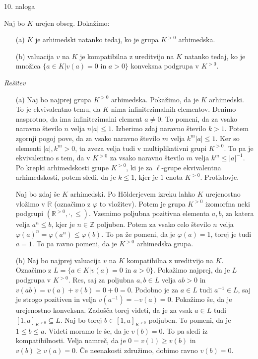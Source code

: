 \documentclass[a4paper, 12pt]{article}
\newcommand{\Z}{\mathbb{Z}}
\newcommand{\R}{\mathbb{R}}
\begin{document}
\begin{flushleft}
10. naloga
\end{flushleft}
Naj bo $K$ urejen obseg. Dokažimo:
\begin{enumerate}
\item[(a)] $K$ je arhimedski natanko tedaj, ko je grupa $K^{>0}$ arhimedska.
\item[(b)] valuacija $v$ na $K$ je kompatibilna z ureditvijo na $K$ natanko tedaj, ko je množica $\{a\in K| v(a) = 0 \text{ in } a > 0\}$ konveksna podgrupa v $K^{>0}$.
\end{enumerate}
\emph{Rešitev}
\begin{enumerate}
\item[(a)] Naj bo najprej grupa $K^{>0}$ arhimedska. Pokažimo, da je $K$ arhimedski. To je ekvivalentno temu, da $K$ nima infinitezimalnih elementov. Denimo nasprotno, da ima infinitezimalni element $a \neq 0$. To pomeni, da za vsako naravno število $n$ velja $n|a| \le 1$. Izberimo zdaj naravno število $k > 1$. Potem zgornji pogoj pove, da za vsako naravno število $m$ velja $k^m |a| \le 1$. Ker so elementi $|a|, k^m > 0$, ta zveza velja tudi v multiplikativni grupi $K^{>0}$. To pa je ekvivalentno s tem, da v $K^{>0} $ za vsako naravno število $m$ velja $k^m \le |a|^{-1}$. Po krepki arhimedskosti grupe $K^{>0}$, ki je za $\ell$-grupe ekvivalentna arhimedskosti, potem sledi, da je $k\le 1$, kjer je $1$ enota $K^{>0}$. Protislovje.

Naj bo zdaj še $K$ arhimedski. Po H\"{o}lderjevem izreku lahko $K$ urejenostno vložimo v $\R$ (označimo z $\varphi$ to vložitev). Potem je grupa $K^{>0}$ izomorfna neki podgrupi $(\R^{>0}, \cdot, \le)$. Vzemimo poljubna pozitivna elementa $a,b$, za katera velja $a^n \le b$, kjer je $n\in\Z$ poljuben. Potem za vsako celo število $n$ velja $ \varphi(a)^n =  \varphi(a^n) \le \varphi(b)$. To pa že pomeni, da je $\varphi(a) = 1$, torej je tudi $a=1$. To pa ravno pomeni, da je $K^{>0}$ arhimedska grupa.

\item[(b)] Naj bo najprej valuacija $v$ na $K$ kompatibilna z ureditvijo na $K$. Označimo z $L = \{a \in K| v(a) = 0 \text{ in } a> 0\}$. Pokažimo najprej, da je $L$ podgrupa v $K^{>0}$. Res, saj za poljubna $a,b\in L$ velja $ab>0$ in $v(ab) = v(a) + v(b)  =  0+0 =  0$. Podobno je za $a\in L$ tudi $a^{-1}\in L$, saj je strogo pozitiven in velja $v(a^{-1} ) = -v(a) = 0$. Pokažimo še, da je urejenostno konveksna. Zadošča torej videti, da je za vsak $a\in L$ tudi $[1, a]_{K^{>0}} \subseteq L$. Naj bo torej $b\in [1,a]_{K^{>0}}$ poljuben. To pomeni, da je $1\le b \le a$. Videti moramo le še, da je $v(b) = 0$. To pa sledi iz kompatibilnosti. Velja namreč, da je $0 = v(1) \ge v(b)$ in $v(b) \ge v(a)  = 0$. Če neenakosti združimo, dobimo ravno $v(b) = 0$.


\end{enumerate}
\end{document}
